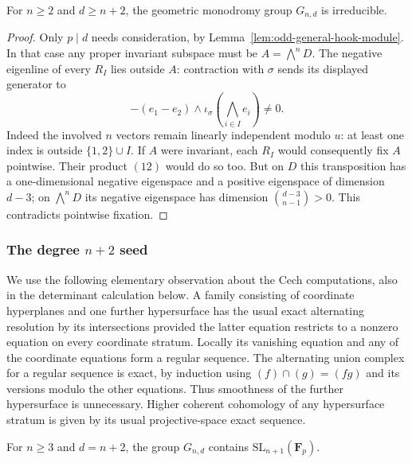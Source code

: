 \begin{proposition}\label{prop:pn-odd-irreducible}
For $n\geq2$ and $d\geq n+2$, the geometric monodromy group
$G_{n,d}$ is irreducible.
\end{proposition}

\begin{proof}
Only $p\mid d$ needs consideration, by
Lemma~\ref{lem:odd-general-hook-module}.  In that case any
proper invariant subspace must be $A=\bigwedge^nD$.
The negative eigenline of every $R_I$ lies outside $A$:
contraction with $\sigma$ sends its displayed generator to
\[
 -(e_1-e_2)\wedge\iota_\sigma
                  \left(\bigwedge_{i\in I}e_i\right)\ne0.
 \tag{**}
\]
Indeed the involved $n$ vectors remain linearly independent
modulo $u$: at least one index is outside $\{1,2\}\cup I$.
If $A$ were invariant, each $R_I$ would consequently fix $A$
pointwise.  Their product $(12)$ would do so too.  But on $D$
this transposition has a one-dimensional negative eigenspace
and a positive eigenspace of dimension $d-3$; on
$\bigwedge^nD$ its negative eigenspace has dimension
$\binom{d-3}{n-1}>0$.  This contradicts pointwise fixation.
\end{proof}


\subsubsection{The degree $n+2$ seed}

We use the following elementary observation about the Cech
computations, also in the determinant calculation below.  A family
consisting of coordinate hyperplanes and one further hypersurface
has the usual exact alternating resolution by its intersections
provided the latter equation restricts to a nonzero equation on
every coordinate stratum.  Locally its vanishing equation and any
of the coordinate equations form a regular sequence.  The
alternating union complex for a regular sequence is exact, by
induction using $(f)\cap(g)=(fg)$ and its versions modulo the
other equations.  Thus smoothness of the further hypersurface is
unnecessary.  Higher coherent cohomology of any hypersurface
stratum is given by its usual projective-space exact sequence.

\begin{proposition}\label{prop:pn-odd-seed-sl}
For $n\geq3$ and $d=n+2$, the group $G_{n,d}$ contains
$\mathrm{SL}_{n+1}(\mathbf F_p)$.
\end{proposition}

